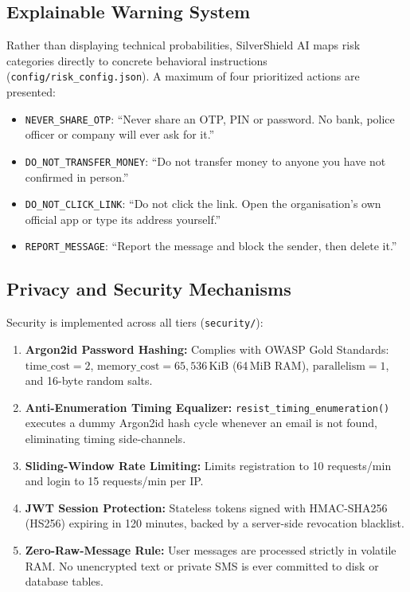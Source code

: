 \documentclass[conference]{IEEEtran}
\begin{document}
\subsection{Explainable Warning System}
Rather than displaying technical probabilities, SilverShield AI maps risk categories directly to concrete behavioral instructions (\texttt{config/risk\_config.json}). A maximum of four prioritized actions are presented:
\begin{itemize}
    \item \texttt{NEVER\_SHARE\_OTP}: ``Never share an OTP, PIN or password. No bank, police officer or company will ever ask for it.''
    \item \texttt{DO\_NOT\_TRANSFER\_MONEY}: ``Do not transfer money to anyone you have not confirmed in person.''
    \item \texttt{DO\_NOT\_CLICK\_LINK}: ``Do not click the link. Open the organisation's own official app or type its address yourself.''
    \item \texttt{REPORT\_MESSAGE}: ``Report the message and block the sender, then delete it.''
\end{itemize}

\subsection{Privacy and Security Mechanisms}
Security is implemented across all tiers (\texttt{security/}):
\begin{enumerate}
    \item \textbf{Argon2id Password Hashing:} Complies with OWASP Gold Standards: $\text{time\_cost} = 2$, $\text{memory\_cost} = 65{,}536$\,KiB (64\,MiB RAM), $\text{parallelism} = 1$, and 16-byte random salts.
    \item \textbf{Anti-Enumeration Timing Equalizer:} \texttt{resist\_timing\_enumeration()} executes a dummy Argon2id hash cycle whenever an email is not found, eliminating timing side-channels.
    \item \textbf{Sliding-Window Rate Limiting:} Limits registration to 10 requests/min and login to 15 requests/min per IP.
    \item \textbf{JWT Session Protection:} Stateless tokens signed with HMAC-SHA256 (HS256) expiring in 120 minutes, backed by a server-side revocation blacklist.
    \item \textbf{Zero-Raw-Message Rule:} User messages are processed strictly in volatile RAM. No unencrypted text or private SMS is ever committed to disk or database tables.
\end{enumerate}
\end{document}
